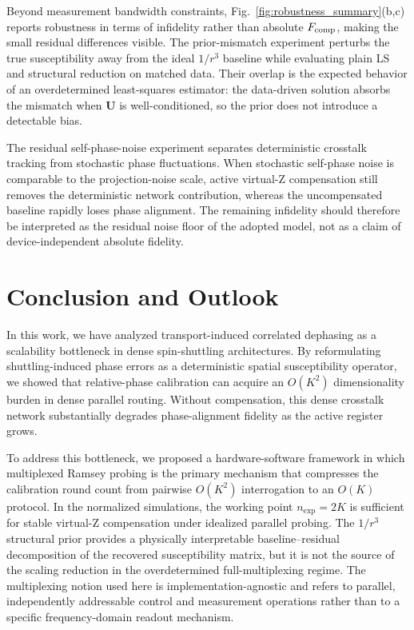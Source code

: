 \documentclass[a4paper,twocolumn,11pt]{quantumarticle}
\begin{document}
Beyond measurement bandwidth constraints, Fig.~\ref{fig:robustness_summary}(b,c) reports robustness in terms of infidelity rather than absolute $F_{\rm comp}$, making the small residual differences visible. The prior-mismatch experiment perturbs the true susceptibility away from the ideal $1/r^3$ baseline while evaluating plain LS and structural reduction on matched data. Their overlap is the expected behavior of an overdetermined least-squares estimator: the data-driven solution absorbs the mismatch when $\mathbf{U}$ is well-conditioned, so the prior does not introduce a detectable bias.

The residual self-phase-noise experiment separates deterministic crosstalk tracking from stochastic phase fluctuations. When stochastic self-phase noise is comparable to the projection-noise scale, active virtual-Z compensation still removes the deterministic network contribution, whereas the uncompensated baseline rapidly loses phase alignment. The remaining infidelity should therefore be interpreted as the residual noise floor of the adopted model, not as a claim of device-independent absolute fidelity.

\section{Conclusion and Outlook}
\label{sec:conclusion}

In this work, we have analyzed transport-induced correlated dephasing as a scalability bottleneck in dense spin-shuttling architectures. By reformulating shuttling-induced phase errors as a deterministic spatial susceptibility operator, we showed that relative-phase calibration can acquire an $O(K^2)$ dimensionality burden in dense parallel routing. Without compensation, this dense crosstalk network substantially degrades phase-alignment fidelity as the active register grows.

To address this bottleneck, we proposed a hardware-software framework in which multiplexed Ramsey probing is the primary mechanism that compresses the calibration round count from pairwise $O(K^2)$ interrogation to an $O(K)$ protocol. In the normalized simulations, the working point $n_{\text{exp}}=2K$ is sufficient for stable virtual-Z compensation under idealized parallel probing. The $1/r^3$ structural prior provides a physically interpretable baseline--residual decomposition of the recovered susceptibility matrix, but it is not the source of the scaling reduction in the overdetermined full-multiplexing regime. The multiplexing notion used here is implementation-agnostic and refers to parallel, independently addressable control and measurement operations rather than to a specific frequency-domain readout mechanism.
\end{document}
